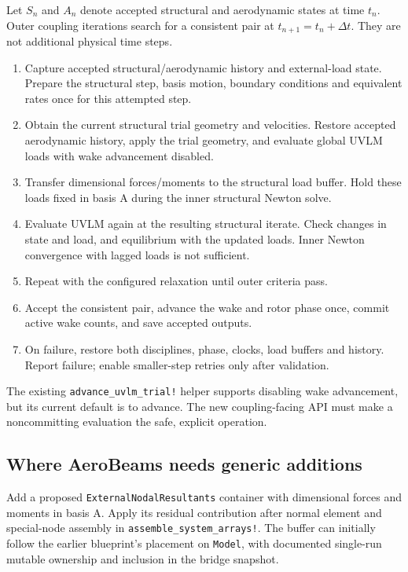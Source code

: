 \documentclass[11pt,a4paper]{article}
\newcommand{\code}{\nolinkurl}
\begin{document}
Let $S_n$ and $A_n$ denote accepted structural and aerodynamic states at time
$t_n$. Outer coupling iterations search for a consistent pair at
$t_{n+1}=t_n+\Delta t$. They are not additional physical time steps.

\begin{enumerate}
\item Capture accepted structural/aerodynamic history and external-load state.
Prepare the structural step, basis motion, boundary conditions and equivalent
rates once for this attempted step.
\item Obtain the current structural trial geometry and velocities.
Restore accepted aerodynamic history, apply the trial geometry, and evaluate
global UVLM loads with wake advancement disabled.
\item Transfer dimensional forces/moments to the structural load buffer.
Hold these loads fixed in basis A during the inner structural Newton solve.
\item Evaluate UVLM again at the resulting structural iterate. Check changes
in state and load, and equilibrium with the updated loads. Inner Newton
convergence with lagged loads is not sufficient.
\item Repeat with the configured relaxation until outer criteria pass.
\item Accept the consistent pair, advance the wake and rotor phase once,
commit active wake counts, and save accepted outputs.
\item On failure, restore both disciplines, phase, clocks, load buffers and
history. Report failure; enable smaller-step retries only after validation.
\end{enumerate}

The existing \code{advance_uvlm_trial!} helper supports disabling wake
advancement, but its current default is to advance. The new coupling-facing
API must make a noncommitting evaluation the safe, explicit operation.

\subsection{Where AeroBeams needs generic additions}

Add a proposed \code{ExternalNodalResultants} container with dimensional
forces and moments in basis A. Apply its residual contribution after normal
element and special-node assembly in \code{assemble_system_arrays!}.
The buffer can initially follow the earlier blueprint's placement on
\code{Model}, with documented single-run mutable ownership and inclusion in
the bridge snapshot.
\end{document}
